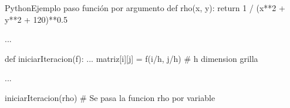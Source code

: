 \documentclass[letterpaper,11pt]{article} %
\begin{document}

\begin{sourcecode}[\label{funporvalor}]{Python}{Ejemplo paso función por argumento}
def rho(x, y):
	return 1 / (x**2 + y**2 + 120)**0.5

...

def iniciarIteracion(f):
	...
	matriz[i][j] = f(i/h, j/h)	# h dimension grilla

...

iniciarIteracion(rho) # Se pasa la funcion rho por variable
\end{sourcecode}


\end{document}
